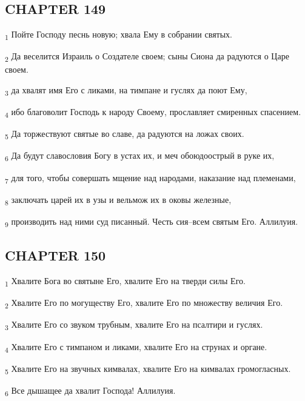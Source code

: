 \subsection{CHAPTER 149}
\begin{tcolorbox}
\textsubscript{1} Пойте Господу песнь новую; хвала Ему в собрании святых.
\end{tcolorbox}
\begin{tcolorbox}
\textsubscript{2} Да веселится Израиль о Создателе своем; сыны Сиона да радуются о Царе своем.
\end{tcolorbox}
\begin{tcolorbox}
\textsubscript{3} да хвалят имя Его с ликами, на тимпане и гуслях да поют Ему,
\end{tcolorbox}
\begin{tcolorbox}
\textsubscript{4} ибо благоволит Господь к народу Своему, прославляет смиренных спасением.
\end{tcolorbox}
\begin{tcolorbox}
\textsubscript{5} Да торжествуют святые во славе, да радуются на ложах своих.
\end{tcolorbox}
\begin{tcolorbox}
\textsubscript{6} Да будут славословия Богу в устах их, и меч обоюдоострый в руке их,
\end{tcolorbox}
\begin{tcolorbox}
\textsubscript{7} для того, чтобы совершать мщение над народами, наказание над племенами,
\end{tcolorbox}
\begin{tcolorbox}
\textsubscript{8} заключать царей их в узы и вельмож их в оковы железные,
\end{tcolorbox}
\begin{tcolorbox}
\textsubscript{9} производить над ними суд писанный. Честь сия--всем святым Его. Аллилуия.
\end{tcolorbox}
\subsection{CHAPTER 150}
\begin{tcolorbox}
\textsubscript{1} Хвалите Бога во святыне Его, хвалите Его на тверди силы Его.
\end{tcolorbox}
\begin{tcolorbox}
\textsubscript{2} Хвалите Его по могуществу Его, хвалите Его по множеству величия Его.
\end{tcolorbox}
\begin{tcolorbox}
\textsubscript{3} Хвалите Его со звуком трубным, хвалите Его на псалтири и гуслях.
\end{tcolorbox}
\begin{tcolorbox}
\textsubscript{4} Хвалите Его с тимпаном и ликами, хвалите Его на струнах и органе.
\end{tcolorbox}
\begin{tcolorbox}
\textsubscript{5} Хвалите Его на звучных кимвалах, хвалите Его на кимвалах громогласных.
\end{tcolorbox}
\begin{tcolorbox}
\textsubscript{6} Все дышащее да хвалит Господа! Аллилуия.
\end{tcolorbox}
